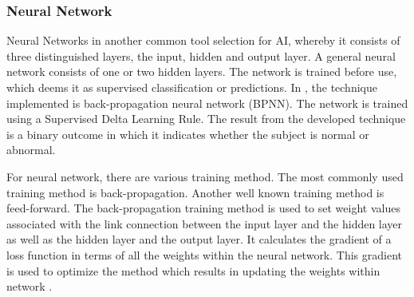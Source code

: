 \documentclass[11pt,twocolumn]{witseiepaper}
\begin{document}
	\subsubsection{Neural Network}
	Neural Networks in another common tool selection for AI, whereby it consists of three distinguished layers, the input, hidden and output layer. A general neural network consists of one or two hidden layers. The network is trained before use, which deems it as supervised classification or predictions. In \cite{jyothi_congenital_2016}, the technique implemented is back-propagation neural network (BPNN). The network is trained using a Supervised Delta Learning Rule. The result from the developed technique is a binary outcome in which it indicates whether the subject is normal or abnormal.
	
	For neural network, there are various training method. The most commonly used training method is back-propagation. Another well known training method is feed-forward. The back-propagation training method is used to set weight values associated with the link connection between the input layer and the hidden layer as well as the hidden layer and the output layer. It calculates the gradient of a loss function in terms of all the weights within the neural network. This gradient is used to optimize the method which results in updating the weights within network \cite{Oukrich2016}.
	
\end{document}
